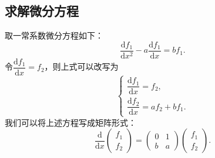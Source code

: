 \subsection{求解微分方程}

取一常系数微分方程如下：
\[\dfrac{\mathrm{d}f_1}{\mathrm{d}x^2}-a\dfrac{\mathrm{d}f_1}{\mathrm{d}x}=bf_1.\]
令$\dfrac{\mathrm{d}f_1}{\mathrm{d}x}=f_2$，则上式可以改写为
\[\begin{cases}
        \dfrac{\mathrm{d}f_1}{\mathrm{d}x}=f_2, \\
        \dfrac{\mathrm{d}f_2}{\mathrm{d}x}=af_2+bf_1.
    \end{cases}\]
我们可以将上述方程写成矩阵形式：
\[\dfrac{\mathrm{d}}{\mathrm{d}x}\begin{pmatrix}
        f_1 \\ f_2
    \end{pmatrix}=\begin{pmatrix}
        0 & 1 \\ b & a
    \end{pmatrix}\begin{pmatrix}
        f_1 \\ f_2
    \end{pmatrix}.\]

